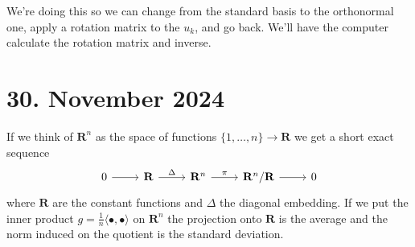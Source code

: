 \documentclass[11pt]{amsart}
\theoremstyle{definition}
\def\RR{\mathbf{R}}
\def\<{\langle}
\def\>{\rangle}
\begin{document}
We're doing this so we can change from the standard basis to the orthonormal one, apply a rotation matrix to the $u_k$, and go back.
We'll have the computer calculate the rotation matrix and inverse.

\section{30. November 2024}

If we think of $\RR^n$ as the space of functions $\{1, \ldots, n\} \to \RR$ we get a short exact sequence
\[
\begin{tikzcd}
0 \ar[r] &
\RR \ar[r,"\Delta"] &
\RR^n \ar[r,"\pi"] &
\RR^n / \RR \ar[r] &
0
\end{tikzcd}
\]
where $\RR$ are the constant functions and $\Delta$ the diagonal embedding.
If we put the inner product $g = \frac 1n \< \bullet, \bullet \>$ on $\RR^n$ the projection onto $\RR$ is the average and the norm induced on the quotient is the standard deviation.
\end{document}
